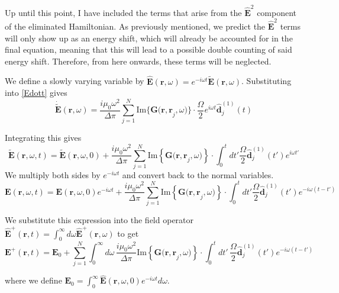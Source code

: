 \documentclass[a4paper, 11pt]{article}
\numberwithin{equation}{section}
\begin{document}
Up until this point, I have included the terms that arise from the
$\hat{\mathbf{E}}^2$ component of the eliminated Hamiltonian. As previously mentioned,
we predict the $\hat{\mathbf{E}}^2$ terms will only show up as an energy shift, which
will already be accounted for in the final equation, meaning that this will lead to a
possible double counting of said energy shift. Therefore, from here onwards, these
terms will be neglected.

\vspace{1em} We define a slowly varying variable by $\hat{\mathbf{E}}(\mathbf{r},
\omega) =
e^{-i\omega t}\tilde{\mathbf{E}}(\mathbf{r}, \omega)$. Substituting into
\ref{Edott} gives
\begin{equation}
  \dot{\tilde{\mathbf{E}}}(\mathbf{r}, \omega) =
  \frac{i\mu_0\omega^2}{\Delta\pi}\sum_{j=1}^N \text{Im}\{ \mathbf{G(r, r}_j,
    \omega) \} \cdot \frac{\Omega}{2}e^{i\omega t}\hat{\mathbf{d}}_j^{(1)}(t)
\end{equation}

Integrating this gives
\begin{equation}
  \tilde{\mathbf{E}}(\mathbf{r}, \omega, t) = \tilde{\mathbf{E}}(\mathbf{r}, \omega,
  0) + \frac{i\mu_0\omega^2}{\Delta\pi}\sum_{j=1}^N \text{Im}\left\{\mathbf{G(r, r}_j,
  \omega)\right\} \cdot \int_0^tdt'
  \frac{\Omega}{2}\hat{\mathbf{d}}_j^{(1)}(t')e^{i\omega t'}
\end{equation}
We multiply both sides by $e^{-i\omega t}$ and convert back to the normal
variables.
\begin{equation}
  \mathbf{E}(\mathbf{r}, \omega, t) = \mathbf{E}(\mathbf{r}, \omega,
  0)e^{-i\omega t} + \frac{i\mu_0\omega^2}{\Delta\pi}\sum_{j=1}^N \text{Im}\left\{\mathbf{G(r, r}_j,
  \omega)\right\} \cdot \int_0^tdt'
  \frac{\Omega}{2}\hat{\mathbf{d}}_j^{(1)}(t')e^{-i\omega (t-t')}
\end{equation}

We substitute this expression into the field operator $\hat{\mathbf{E}}^+(\mathbf{r},
t) = \int_0^\infty d\omega\hat{\mathbf{E}}^+(\mathbf{r}, \omega)$ to get
\begin{equation}
  \mathbf{E}^+(\mathbf{r}, t) = \mathbf{E}_0 +
  \sum_{j=1}^N \int_0^\infty d\omega\,\frac{i\mu_0\omega^2}{\Delta\pi}
  \text{Im}\left\{\mathbf{G(r, r}_j,
  \omega)\right\} \cdot \int_0^tdt'\,
  \frac{\Omega}{2}\hat{\mathbf{d}}_j^{(1)}(t')e^{-i\omega (t-t')}
\end{equation}

where we define $\mathbf{E}_0 = \int_0^\infty \hat{\mathbf{E}}(\mathbf{r}, \omega,
0)e^{-i\omega t}d\omega$.
\end{document}
